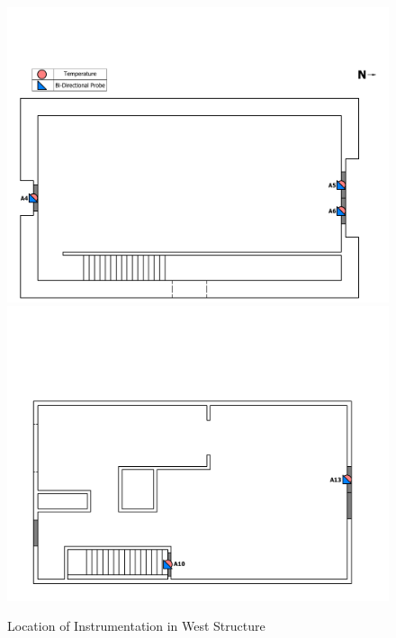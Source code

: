 \documentclass[12pt,oneside]{book}
\begin{document}
\begin{figure}[!ht]
\includegraphics[trim=0cm 0cm 0.75cm 4.5cm, clip=true, width=6in]{../../Drawings/PDFs/With_Instrumentation/West_Test_Structure_Devices_Hose_Test_1st_Floor}
\\
\includegraphics[trim=0cm 0cm 0.75cm 5.0cm, clip=true, width=6in]{../../Drawings/PDFs/With_Instrumentation/West_Test_Structure_Devices_Hose_Test_2nd_Floor}
\caption[Location of Instrumentation in West Structure]{Location of Instrumentation in West Structure}
\label{fig:west_instrumentation}
\end{figure}
\end{document}

